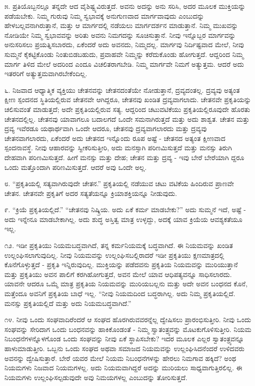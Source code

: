 ೫. ಪ್ರತಿಯೊಬ್ಬನಲ್ಲೂ ತನ್ನದೇ ಆದ ವೈಶಿಷ್ಟ್ಯವಿರುತ್ತದೆ. ಅವನು ಅದನ್ನು ಅನು ಸರಿಸಿ, ಅದರ ಮೂಲಕ ಮುಕ್ತಿಯನ್ನು ಪಡೆಯಬೇಕು. ನಿಮ್ಮ ಗುರುವು ನಿಮ್ಮ ಸ್ವಭಾವಕ್ಕೆ ಅನುಗುಣವಾದ ಮಾರ್ಗವಾವುದು ಎಂಬುದನ್ನು ಹೇಳಬಲ್ಲವನಾಗಿರುತ್ತಾನೆ, ಮತ್ತು ಆ ಮಾರ್ಗದಲ್ಲಿ ನಡೆಯಲು ಮಾರ್ಗದರ್ಶನ ಮಾಡುತ್ತಾನೆ. ನಿಮ್ಮ ಮುಖವನ್ನು ನೋಡಿಯೇ ನಿಮ್ಮ ಸ್ವಭಾವವನ್ನು ಅರಿತು ಅವನು ನಿಮಗದನ್ನು ಸೂಚಿಸುತ್ತಾನೆ. ನೀವು ಇನ್ನೊಬ್ಬರ ಮಾರ್ಗವನ್ನು ಅನುಸರಿಸಲು ಪ್ರಯತ್ನಿಸಬಾರದು, ಏಕೆಂದರೆ ಅದು ಅವನದು, ನಿಮ್ಮದಲ್ಲ. ಮಾರ್ಗವು ನಿರ್ದಿಷ್ಟವಾದ ಮೇಲೆ, ನೀವು ಸುಮ್ಮನೆ ಕೈಕಟ್ಟಿಕೊಂಡು ನಿಂತುಬಿಡಬಹುದು, ಪ್ರವಾಹವೇ ನಿಮ್ಮನ್ನು ಕರೆದುಕೊಂಡು ಹೋಗುತ್ತದೆ. ಆದ್ದರಿಂದ ನಿಮ್ಮ ಮಾರ್ಗ ತಿಳಿದ ಮೇಲೆ ಅದರಿಂದ ಎಂದೂ ವಿಚಲಿತರಾಗಬೇಡಿ. ನಿಮ್ಮ ಮಾರ್ಗವೇ ನಿಮಗೆ ಅತ್ಯುತ್ತಮ. ಆದರೆ ಅದು ಇತರರಿಗೆ ಅತ್ಯುತ್ತಮವಾಗಿರಬೇಕೆಂದಿಲ್ಲ.

೬. ನಿಜವಾದ ಆಧ್ಯಾತ್ಮಿಕ ವ್ಯಕ್ತಿಯು ಚೇತನವನ್ನು ಚೇತನದಂತೆಯೇ ನೋಡುತ್ತಾನೆ, ದ್ರವ್ಯದಂತಲ್ಲ. ದ್ರವ್ಯವು ಅತ್ಯಂತ ಕ್ಷೀಣ ಸ್ಪಂದನದ ಸ್ಥಿತಿಯಲ್ಲಿರುವ ಚೇತನವೇ ಆಗಿದ್ದರೂ, ಚೇತನವು ಖಂಡಿತ ದ್ರವ್ಯವಾಗಲಾದು. ಚೇತನವೇ ಪ್ರಕೃತಿಯನ್ನು ಚಲಿಸುವಂತೆ ಮಾಡುತ್ತದೆ; ಅದೇ ಪ್ರಕೃತಿಯಲ್ಲಿರುವ ಸತ್ಯ. ಆದ್ದರಿಂದ ಚಟುವಟಿಕೆಯು ಪ್ರಕೃತಿಯಲ್ಲಿರೂವುದೇ ಹೊರತು ಚೇತನದಲ್ಲಿಲ್ಲ. ಚೇತನವು ಯಾವಾಗಲೂ ಬದಾಲಗದೆ ಒಂದೇ ಸಮನಾಗಿರುತ್ತದೆ ಮತ್ತು ಅದು ಶಾಶ್ವತ. ಚೇತನ ಮತ್ತು ದ್ರವ್ಯ ಇವೆರಡೂ ಯಥಾರ್ಥವಾಗಿ ಒಂದೇ ಆದರೂ, ಚೇತನವು ದ್ರವ್ಯವಾಗಲಾರದು ಮತ್ತು ದ್ರವ್ಯವು ಚೇತನವಾಗಲಾರದು, ಏಕೆಂದರೆ ಅದು ಚೇತನದ ಇನ್ನೊಂದು ರೂಪ ಅಷ್ಟೆ - ಚೇತನದ ಅತ್ಯಂತ ಕ್ಷೀಣವಾದ ಸ್ಪಂದನಾವಸ್ಥೆ. ನೀವು ಆಹಾರವನ್ನು ಸ್ವೀಕರಿಸುತ್ತೀರಿ, ಅದು ಮನಸ್ಸಾಗಿ ಪರಿಣಮಿಸುತ್ತದೆ ಮತ್ತು ಮನಸ್ಸು ತಿರುಗಿ ದೇಹವಾಗಿ ಪರಿಣಮಿಸುತ್ತದೆ. ಹೀಗೆ ಮನಸ್ಸು ಮತ್ತು ದೇಹ; ಚೇತನ ಮತ್ತು ದ್ರವ್ಯ - ಇವು ಬೇರೆ ಬೇರೆಯಾಗಿ ದ್ದರೂ ಒಂದು ಮತ್ತೊಂದಾಗಿ ಪರಿಣಮಿಸುತ್ತದೆ. ಆದರೆ ಅವು ಒಂದೇ ಅಲ್ಲ.

೮. “ಪ್ರಕೃತಿಯಲ್ಲಿ ಸತ್ಯವಾಗಿರುವುದೇ ಚೇತನ.” ಪ್ರಕೃತಿಯಲ್ಲಿ ನಡೆಯುವ ಚಟು ವಟಿಕೆಯ ಹಿಂದಿರುವ ಪ್ರಾಣವೇ ಚೇತನ. ಚೇತನವೇ ಪ್ರಕೃತಿಗೆ ಅದರ ಸತ್ಯತೆಯನ್ನೂ ಕ್ರಿಯಾಶಕ್ತಿಯನ್ನೂ ನೀಡುವುದು.

೯. “ಕ್ರಿಯೆ ಪ್ರಕೃತಿಯಲ್ಲಿದೆ.” “ಚೇತನವು ನಿಷ್ಕ್ರಿಯ. ಅದು ಏಕೆ ಕರ್ಮ ಮಾಡಬೇಕು?” ಅದು ಸುಮ್ಮನೆ ಇದೆ, ಅಷ್ಟೆ - ಅದು ಇನ್ನೇನೂ ಮಾಡಬೇಕಾಗಿಲ್ಲ. ಅದು ಶುದ್ಧ ಅಸ್ತಿತ್ವ ಮಾತ್ರ ಉಳ್ಳದ್ದು, ಅದಕ್ಕೆ ಯಾವ ಕ್ರಿಯೆಯ ಆವಶ್ಯಕತೆಯೂ ಇಲ್ಲ.

೧೨. ಇಡೀ ಪ್ರಕೃತಿಯು ನಿಯಮಬದ್ಧವಾಗಿದೆ, ತನ್ನ ಕರ್ಮನಿಯಮಕ್ಕೆ ಬದ್ಧವಾಗಿದೆ. ಈ ನಿಯಮವನ್ನು ಖಂಡಿತ ಉಲ್ಲಂಘಿಸಲಾಗುವುದಿಲ್ಲ. ನೀವು ನಿಯಮವನ್ನು ಉಲ್ಲಂಘಿಸಬಲ್ಲಿರಾದರೆ ಇಡೀ ಪ್ರಕೃತಿಯು ಕ್ಷಣಮಾತ್ರದಲ್ಲಿ ಕೊನೆಗೊಳ್ಳುತ್ತದೆ - ಪ್ರಕೃತಿ ಇನ್ನಿರುವುದಿಲ್ಲ. ಮುಕ್ತಿಯನ್ನು ಪಡೆದವನು ಪ್ರಕೃತಿಯ ನಿಯಮವನ್ನು ಮುರಿಯುತ್ತಾನೆ ಮತ್ತು ಪ್ರಕೃತಿಯು ಅವನ ಪಾಲಿಗೆ ಕರಗಿಹೋಗುತ್ತದೆ, ಅವನ ಮೇಲೆ ಯಾವ ಆಧಿಪತ್ಯವನ್ನೂ ಸಾಧಿಸಲಾರದು. ಯಾವನೇ ಆದರೂ ಒಮ್ಮೆ ಮಾತ್ರ ಪ್ರಕೃತಿಯ ನಿಯಮವನ್ನು ಮುರಿಯಬಲ್ಲನು ಮತ್ತು ಅದೇ ಅವನ ಬಂಧನದ ಕೊನೆ, ಮತ್ತೆಂದೂ ಅವನಿಗೆ ಪ್ರಕೃತಿಯ ಬಾಧೆ ಇಲ್ಲ. “ನೀವು ನಿಯಮದಿಂದ ಬದ್ಧರಾಗಿಲ್ಲ. ಅದು ನಿಮ್ಮ ಪ್ರಕೃತಿಯಲ್ಲಿದೆ. ಮನಸ್ಸು ಪ್ರಕೃತಿಯಲ್ಲಿದೆ ಮತ್ತು ಅದು ನಿಯಮಬದ್ಧವಾಗಿದೆ.”

೧೪. ನೀವು ಒಂದು ಸಂಘವಾದಿರೆಂದರೆ ಆ ಸಂಘದ ಹೊರಗಿರುವವರನ್ನೆಲ್ಲ ದ್ವೇಷಿಸಲು ಪ್ರಾರಂಭಿಸುತ್ತೀರಿ. ನೀವು ಒಂದು ಸಂಘವನ್ನು ಸೇರಿದಾಗ ಒಂದು ಬಂಧನವನ್ನು ಹಾಕಿಕೊಂಡಂತೆ - ನಿಮ್ಮ ಸ್ವಾತಂತ್ರ್ಯವನ್ನು ಮೊಟಕುಗೊಳಿಸುತ್ತೀರಿ. ನಿಯಮ ನಿಬಂಧನೆಗಳನ್ನೊಳಗೊಂಡ ಒಂದು ಸಂಘವನ್ನು ನೀವು ಏಕೆ ಸ್ಥಾಪಿಸಬೇಕು? ಇದರ ಮೂಲಕ ಎಲ್ಲರ ಸ್ವಾತಂತ್ರ್ಯವನ್ನೂ ಹಾಳುಮಾಡುತ್ತೀರಿ. ಒಬ್ಬನು ಒಂದು ಸಂಘದ ಅಥವಾ ಸಮಾಜದ ನಿಯಮವನ್ನು ಉಲ್ಲಂಘಿಸಿದನೆಂದರೆ ಉಳಿದವರು ಅವನನ್ನು ದ್ವೇಷಿಸುತ್ತಾರೆ. ಬೇರೆ ಯವರ ಮೇಲೆ ನಿಯಮ ನಿಬಂಧನೆಗಳನ್ನು ಹೇರಲು ನಿಮಗಾವ ಹಕ್ಕಿದೆ? ಅಂಥ ನಿಯಮಗಳು ನಿಜವಾದ ನಿಯಮಗಳಲ್ಲ. ಅದು ನಿಯಮವಾಗಿದ್ದರೆ ಅದನ್ನು ಮುರಿಯಲು ಸಾಧ್ಯವಾಗುತ್ತಿರಲಿಲ್ಲ. ಈ ನಿಯಮಗಳು ಉಲ್ಲಂಘಿಸಲ್ಪಡುವುದೇ ಅವು ನಿಮಯಗಳಲ್ಲ ಎಂಬುದನ್ನು ತೋರಿಸುತ್ತದೆ.

